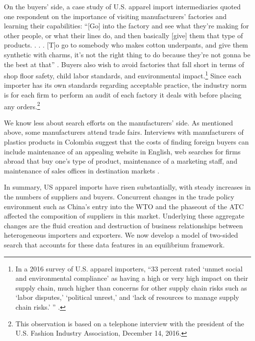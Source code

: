 \documentclass[12pt]{article} \usepackage{amsmath,amssymb,amsthm,geometry,graphicx,setspace,algorithm,algpseudocode,float}
\newcommand{\quotes}[1]{``#1''}
\begin{document}
On the buyers' side, a case study of U.S. apparel import intermediaries quoted one respondent on the importance of visiting manufacturers' factories and learning their
capabilities: \quotes{[Go] into the factory and see what they're making
for other people, or what their lines do, and then basically [give] them
that type of products. . . . [T]o go to somebody who makes cotton
underpants, and give them synthetic with charms, it's not the right thing to
do because they're not gonna be the best at that} %
\citep{HabrookshireDyer2008}. Buyers also wish to avoid factories that
fall short in terms of shop floor safety, child labor standards, and
environmental impact.\footnote{%
In a 2016 survey of U.S. apparel importers, \quotes{33 percent rated `unmet social
and environmental compliance' as having a high or very high impact on their
supply chain, much higher than concerns for other supply chain risks such as
`labor disputes,' `political unrest,' and `lack of resources to manage
supply chain risks.' } \citep{lu2016}.\medskip} Since each importer
has its own standards regarding acceptable practice, the industry norm
is for each firm to perform an audit of each factory it deals with before placing any
orders.\footnote{%
This observation is based on a telephone interview with the president of the
U.S. Fashion Industry Association, December 14, 2016.\medskip}

We know less about search efforts on the manufacturers' side.
As mentioned above, some manufacturers attend trade fairs. Interviews with manufacturers of plastics products in
Colombia suggest that the costs of finding foreign buyers can include
maintenance of an appealing website in English, web searches for firms
abroad that buy one's type of product, maintenance of a marketing staff, and
maintenance of sales offices in destination markets %
\citep{dominguez2010search}.

In summary, US apparel imports have risen substantially, with steady increases in the numbers of suppliers and buyers. Concurrent changes in the trade policy environment such as China's entry into the WTO and the phaseout of the ATC
affected the composition of suppliers in this market. Underlying these aggregate changes are the 
fluid creation and destruction of business relationships between heterogeneous importers and exporters. We now develop a model of two-sided search that accounts for these data features in an equilibrium framework.
\end{document}
